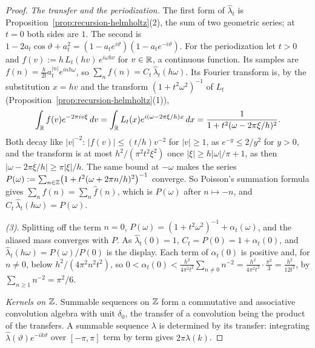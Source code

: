 \begin{proof}
\emph{The transfer and the periodization.} The first form of $\widehat\lambda_t$ is
Proposition~\ref{prop:recursion-helmholtz}(2), the sum of two geometric series; at $t = 0$ both
sides are $1$. The second is
$1 - 2a_t\cos\vartheta + a_t^2 = (1 - a_te^{i\vartheta})(1 - a_te^{-i\vartheta})$. For the
periodization let $t > 0$ and $f(v) := h\,L_t(hv)\,e^{i\omega hv}$ for $v \in \mathbb{R}$, a continuous
function. Its samples are $f(n) = \tfrac{h}{2t}a_t^{|n|}e^{inh\omega}$, so
$\sum_nf(n) = C_t\,\widehat\lambda_t(h\omega)$. Its Fourier transform is, by the substitution
$x = hv$ and the transform $(1 + t^2\omega^2)^{-1}$ of $L_t$
(Proposition~\ref{prop:recursion-helmholtz}(1)),
\[
  \int_{\mathbb{R}}f(v)e^{-2\pi iv\xi}\,dv = \int_{\mathbb{R}}L_t(x)e^{i(\omega - 2\pi\xi/h)x}\,dx
  = \frac{1}{1 + t^2(\omega - 2\pi\xi/h)^2} .
\]
Both decay like $|v|^{-2}$: $|f(v)| \le (t/h)v^{-2}$ for $|v| \ge 1$, as $e^{-y} \le 2/y^2$ for
$y > 0$, and the transform is at most $h^2/(\pi^2t^2\xi^2)$ once $|\xi| \ge h|\omega|/\pi + 1$, as
then $|\omega - 2\pi\xi/h| \ge \pi|\xi|/h$. The same bound at $-\omega$ makes the series
$P(\omega) := \sum_{n \in \mathbb{Z}}\bigl(1 + t^2(\omega + 2\pi n/h)^2\bigr)^{-1}$ converge. So Poisson's
summation formula gives $\sum_nf(n) = \sum_n\widehat f(n)$, which is $P(\omega)$ after
$n \mapsto -n$, and $C_t\,\widehat\lambda_t(h\omega) = P(\omega)$.

\emph{(3).} Splitting off the term $n = 0$, $P(\omega) = (1 + t^2\omega^2)^{-1} + \alpha_t(\omega)$,
and the aliased mass converges with $P$. As $\widehat\lambda_t(0) = 1$,
$C_t = P(0) = 1 + \alpha_t(0)$, and $\widehat\lambda_t(h\omega) = P(\omega)/P(0)$ is the display.
Each term of $\alpha_t(0)$ is positive and, for $n \ne 0$, below $h^2/(4\pi^2n^2t^2)$, so
$0 < \alpha_t(0) < \tfrac{h^2}{4\pi^2t^2}\sum_{n \ne 0}n^{-2} = \tfrac{h^2}{4\pi^2t^2}\cdot
\tfrac{\pi^2}{3} = \tfrac{h^2}{12t^2}$, by $\sum_{n \ge 1}n^{-2} = \pi^2/6$.

\emph{Kernels on $\mathbb{Z}$.} Summable sequences on $\mathbb{Z}$ form a commutative and associative convolution
algebra with unit $\delta_0$, the transfer of a convolution being the product of the transfers. A
summable sequence $\lambda$ is determined by its transfer: integrating
$\widehat\lambda(\vartheta)e^{-ik\vartheta}$ over $[-\pi,\pi]$ term by term gives $2\pi\lambda(k)$.


\end{proof}
